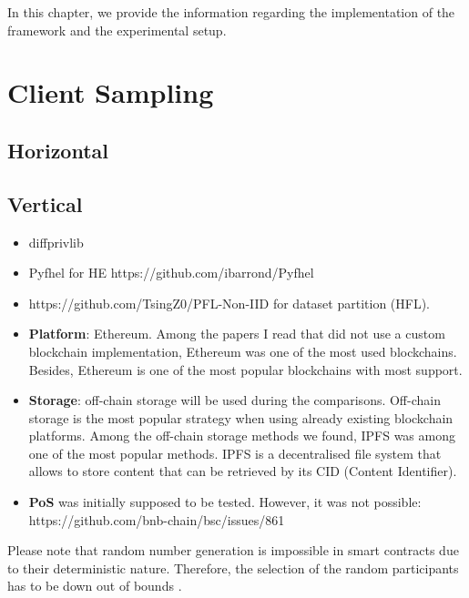 In this chapter, we provide the information regarding the implementation of the framework and the experimental setup.

\section{Client Sampling}

\todo{}

\subsection{Horizontal}

\todo{}

\subsection{Vertical}

\todo{}


\begin{itemize}

    \item diffprivlib \cite{diffprivlib}
    
    \item Pyfhel for HE https://github.com/ibarrond/Pyfhel
    \item https://github.com/TsingZ0/PFL-Non-IID for dataset partition (HFL).
    
    \item \textbf{Platform}: Ethereum. Among the papers I read that did not use a custom blockchain implementation, Ethereum was one of the most used blockchains. Besides, Ethereum is one of the most popular blockchains with most support.
    
    \item \textbf{Storage}: off-chain storage will be used during the comparisons. Off-chain storage is the most popular strategy when using already existing blockchain platforms. Among the off-chain storage methods we found, IPFS was among one of the most popular methods.  IPFS is a decentralised file system that allows to store content that can be retrieved by its CID (Content Identifier).
    
    \item \textbf{PoS} was initially supposed to be tested. However, it was not possible: https://github.com/bnb-chain/bsc/issues/861
\end{itemize}

    
Please note that random number generation is impossible in smart contracts due to their deterministic nature. Therefore, the selection of the random participants has to be down out of bounds \cite{9293091}. 